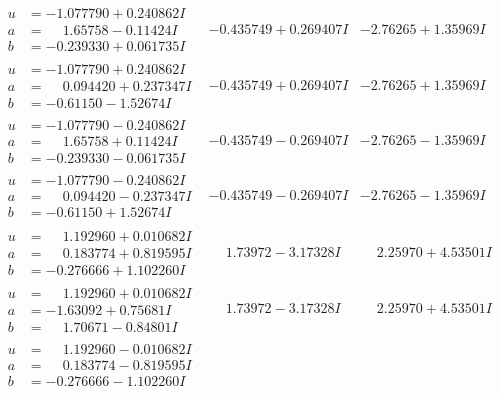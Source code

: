 \documentclass[1p]{elsarticle_modified}
\theoremstyle{definition}
\begin{document}
$$\begin{array}{c|c|c}
\begin{aligned}
u &= -1.077790 + 0.240862 I \\
a &= \phantom{-}1.65758 - 0.11424 I \\
b &= -0.239330 + 0.061735 I\end{aligned}
 & -0.435749 + 0.269407 I & -2.76265 + 1.35969 I \\ \hline\begin{aligned}
u &= -1.077790 + 0.240862 I \\
a &= \phantom{-}0.094420 + 0.237347 I \\
b &= -0.61150 - 1.52674 I\end{aligned}
 & -0.435749 + 0.269407 I & -2.76265 + 1.35969 I \\ \hline\begin{aligned}
u &= -1.077790 - 0.240862 I \\
a &= \phantom{-}1.65758 + 0.11424 I \\
b &= -0.239330 - 0.061735 I\end{aligned}
 & -0.435749 - 0.269407 I & -2.76265 - 1.35969 I \\ \hline\begin{aligned}
u &= -1.077790 - 0.240862 I \\
a &= \phantom{-}0.094420 - 0.237347 I \\
b &= -0.61150 + 1.52674 I\end{aligned}
 & -0.435749 - 0.269407 I & -2.76265 - 1.35969 I \\ \hline\begin{aligned}
u &= \phantom{-}1.192960 + 0.010682 I \\
a &= \phantom{-}0.183774 + 0.819595 I \\
b &= -0.276666 + 1.102260 I\end{aligned}
 & \phantom{-}1.73972 - 3.17328 I & \phantom{-}2.25970 + 4.53501 I \\ \hline\begin{aligned}
u &= \phantom{-}1.192960 + 0.010682 I \\
a &= -1.63092 + 0.75681 I \\
b &= \phantom{-}1.70671 - 0.84801 I\end{aligned}
 & \phantom{-}1.73972 - 3.17328 I & \phantom{-}2.25970 + 4.53501 I \\ \hline\begin{aligned}
u &= \phantom{-}1.192960 - 0.010682 I \\
a &= \phantom{-}0.183774 - 0.819595 I \\
b &= -0.276666 - 1.102260 I\end{aligned}

\end{array}$$
\end{document}
